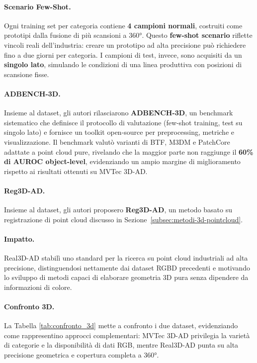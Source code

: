 \paragraph{Scenario Few-Shot.} Ogni training set per categoria contiene \textbf{4 campioni normali}, costruiti come prototipi dalla fusione di più scansioni a 360°. Questo \textbf{few-shot scenario} riflette vincoli reali dell'industria: creare un prototipo ad alta precisione può richiedere fino a due giorni per categoria. I campioni di test, invece, sono acquisiti da un \textbf{singolo lato}, simulando le condizioni di una linea produttiva con posizioni di scansione fisse.

\paragraph{ADBENCH-3D.} Insieme al dataset, gli autori rilasciarono \textbf{ADBENCH-3D}, un benchmark sistematico che definisce il protocollo di valutazione (few-shot training, test su singolo lato) e fornisce un toolkit open-source per preprocessing, metriche e visualizzazione. Il benchmark valutò varianti di BTF, M3DM e PatchCore adattate a point cloud pure, rivelando che la maggior parte non raggiunge il \textbf{60\% di AUROC object-level}, evidenziando un ampio margine di miglioramento rispetto ai risultati ottenuti su MVTec 3D-AD.

\paragraph{Reg3D-AD.} Insieme al dataset, gli autori proposero \textbf{Reg3D-AD}, un metodo basato su registrazione di point cloud discusso in Sezione~\ref{subsec:metodi-3d-pointcloud}.

\paragraph{Impatto.} Real3D-AD stabilì uno standard per la ricerca su point cloud industriali ad alta precisione, distinguendosi nettamente dai dataset RGBD precedenti e motivando lo sviluppo di metodi capaci di elaborare geometria 3D pura senza dipendere da informazioni di colore.


\paragraph{Confronto 3D.} La Tabella \ref{tab:confronto_3d} mette a confronto i due dataset, evidenziando come rappresentino approcci complementari: MVTec 3D-AD privilegia la varietà di categorie e la disponibilità di dati RGB, mentre Real3D-AD punta su alta precisione geometrica e copertura completa a 360°.

